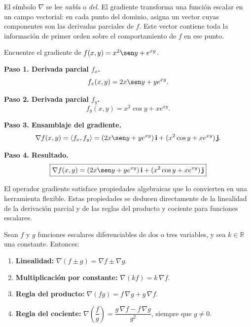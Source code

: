 \begin{rem}
El símbolo $\nabla$ se lee \emph{nabla} o \emph{del}. El gradiente
transforma una función escalar en un campo vectorial: en cada punto del
dominio, asigna un vector cuyas componentes son las derivadas parciales
de $f$. Este vector contiene toda la información de primer orden sobre
el comportamiento de $f$ en ese punto.
\end{rem}

\begin{example}
Encuentre el gradiente de $f(x,y) = x^2 \sen y + e^{xy}$.
\begin{myproof}
\textbf{Paso 1. Derivada parcial $f_x$.}
\[
f_x(x,y) = 2x \sen y + y e^{xy}.
\]

\textbf{Paso 2. Derivada parcial $f_y$.}
\[
f_y(x,y) = x^2 \cos y + x e^{xy}.
\]

\textbf{Paso 3. Ensamblaje del gradiente.}
\[
\nabla f(x,y) = \langle f_x, f_y\rangle = (2x \sen y + y e^{xy})\,\mathbf{i}+(x^2 \cos y + x e^{xy})\,\mathbf{j}.
\]

\textbf{Paso 4. Resultado.}
\[
\boxed{\nabla f(x,y) = (2x \sen y + y e^{xy})\,\mathbf{i}
              + (x^2 \cos y + x e^{xy})\,\mathbf{j}}
\]
\end{myproof}
\end{example}

El operador gradiente satisface propiedades algebraicas que lo convierten
en una herramienta flexible. Estas propiedades se deducen directamente de
la linealidad de la derivación parcial y de las reglas del producto y
cociente para funciones escalares.

\begin{theorem}
Sean $f$ y $g$ funciones escalares diferenciables de dos o tres
variables, y sea $k\in\mathbb{R}$ una constante. Entonces:
\begin{enumerate}
    \item \textbf{Linealidad:}
    $\nabla(f \pm g) = \nabla f \pm \nabla g$.
    \item \textbf{Multiplicación por constante:}
    $\nabla(kf) = k\,\nabla f$.
    \item \textbf{Regla del producto:}
    $\nabla(fg) = f\,\nabla g + g\,\nabla f$.
    \item \textbf{Regla del cociente:}
    $\nabla\left(\dfrac{f}{g}\right) =
    \dfrac{g\,\nabla f - f\,\nabla g}{g^2}$, siempre que $g\neq 0$.
\end{enumerate}
\end{theorem}


